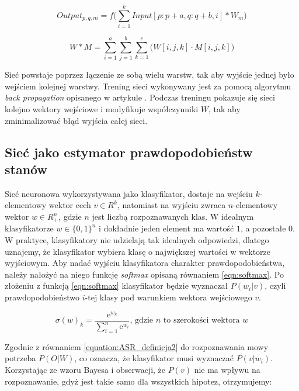 \documentclass[shortabstract, mgr]{iithesis}
\begin{document}
		\begin{equation}
		Output_{p,q,m} = f\bigg(\sum_{i=1}^k Input[p:p+a, q:q+b, i] \ast W_m\bigg)
		\label{eqn:nn_conv}
		\end{equation}
		
		\begin{equation}
			W \ast M = \sum_{i=1}^a \sum_{j=1}^b \sum_{k=1}^c \bigg( W[i,j,k] \cdot M[i,j,k] \bigg)
			\label{eqn:conv}
		\end{equation}
		
		Sieć powstaje poprzez łączenie ze sobą wielu warstw, tak aby wyjście jednej było wejściem kolejnej warstwy. Trening sieci wykonywany jest za pomocą algorytmu \textit{back propagation} opisanego w artykule \cite{pack_propagation}. Podczas treningu pokazuje się sieci kolejno wektory wejściowe i modyfikuje współczynniki $W$, tak aby zminimalizować błąd wyjścia całej sieci.
	
	\subsection{Sieć jako estymator prawdopodobieństw stanów }
	\label{sec:nn_estymator}
		Sieć neuronowa wykorzystywana jako klasyfikator, dostaje na wejściu $k$-elementowy wektor cech $v \in R^k$, natomiast na wyjściu zwraca $n$-elementowy wektor $w \in R_+^n$, gdzie $n$ jest liczbą rozpoznawanych klas. W idealnym klasyfikatorze $w \in \{0,1\}^n$ i dokładnie jeden element ma wartość $1$, a pozostałe $0$. W praktyce, klasyfikatory nie udzielają tak idealnych odpowiedzi, dlatego uznajemy, że klasyfikator wybiera klasę o największej wartości w wektorze wyjściowym. Aby nadać wyjściu klasyfikatora charakter prawdopodobieństwa, należy nałożyć na niego funkcję \textit{softmax} opisaną równaniem \ref{eqn:softmax}. Po złożeniu z funkcją \ref{eqn:softmax} klasyfikator będzie wyznaczał $P(w_i|v)$, czyli prawdopodobieństwo $i$-tej klasy pod warunkiem wektora wejściowego $v$.
		
		\begin{equation}
			\sigma(w)_k=\frac{\mathrm{e}^{w_k}}{\sum_{i=1}^{n} \mathrm{e}^{w_i}}
			\text{,   gdzie $n$ to szerokości wektora $w$}
			\label{eqn:softmax}
		\end{equation}
		
		Zgodnie z równaniem \ref{equation:ASR_definicja2} do rozpoznawania mowy potrzeba $P(O|W)$, co oznacza, że klasyfikator musi wyznaczać $P(v|w_i)$. Korzystając ze wzoru Bayesa i obserwacji, że $P(v)$ nie ma wpływu na rozpoznawanie, gdyż jest takie samo dla wszystkich hipotez, otrzymujemy:
		
\end{document}
